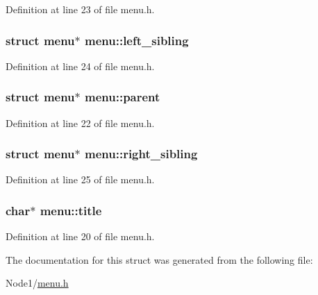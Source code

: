 Definition at line 23 of file menu.\+h.

\subsubsection[{\texorpdfstring{left\+\_\+sibling}{left_sibling}}]{\setlength{\rightskip}{0pt plus 5cm}struct {\bf menu}$\ast$ menu\+::left\+\_\+sibling}\hypertarget{structmenu_a38a41dc18d5c308d3a5e87ed966db330}{}\label{structmenu_a38a41dc18d5c308d3a5e87ed966db330}


Definition at line 24 of file menu.\+h.

\subsubsection[{\texorpdfstring{parent}{parent}}]{\setlength{\rightskip}{0pt plus 5cm}struct {\bf menu}$\ast$ menu\+::parent}\hypertarget{structmenu_ab37f2faa5398d13b27ca50dcfd4e36e4}{}\label{structmenu_ab37f2faa5398d13b27ca50dcfd4e36e4}


Definition at line 22 of file menu.\+h.

\subsubsection[{\texorpdfstring{right\+\_\+sibling}{right_sibling}}]{\setlength{\rightskip}{0pt plus 5cm}struct {\bf menu}$\ast$ menu\+::right\+\_\+sibling}\hypertarget{structmenu_a1197cb481c01c81485b65584b9bcc904}{}\label{structmenu_a1197cb481c01c81485b65584b9bcc904}


Definition at line 25 of file menu.\+h.

\subsubsection[{\texorpdfstring{title}{title}}]{\setlength{\rightskip}{0pt plus 5cm}char$\ast$ menu\+::title}\hypertarget{structmenu_af250bc734581d5eee7934057e7eb61da}{}\label{structmenu_af250bc734581d5eee7934057e7eb61da}


Definition at line 20 of file menu.\+h.



The documentation for this struct was generated from the following file\+:\begin{DoxyCompactItemize}
\item 
Node1/\hyperlink{menu_8h}{menu.\+h}\end{DoxyCompactItemize}
